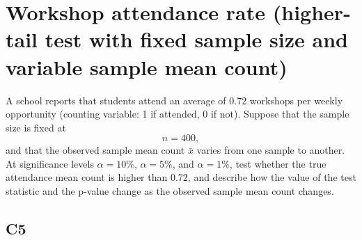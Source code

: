 \section{Workshop attendance rate (higher-tail test with fixed sample size and variable sample mean count)}
A school reports that students attend an average of 0.72 workshops per weekly opportunity (counting variable: 1 if attended, 0 if not). Suppose that the sample size is fixed at
\[
n=400,
\]
and that the observed sample mean count \(\bar x\) varies from one sample to another. At significance levels \(\alpha=10\%\), \(\alpha=5\%\), and \(\alpha=1\%\), test whether the true attendance mean count is higher than 0.72, and describe how the value of the test statistic and the p-value change as the observed sample mean count changes.

\subsection*{C5}
